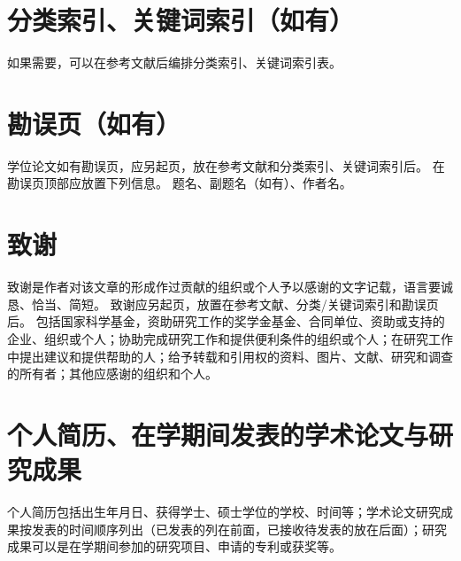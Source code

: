 \section{分类索引、关键词索引（如有）}

如果需要，可以在参考文献后编排分类索引、关键词索引表。

\section{勘误页（如有）}

学位论文如有勘误页，应另起页，放在参考文献和分类索引、关键词索引后。
在勘误页顶部应放置下列信息。
题名、副题名（如有）、作者名。

\section{致谢}

致谢是作者对该文章的形成作过贡献的组织或个人予以感谢的文字记载，语言要诚恳、恰当、简短。
致谢应另起页，放置在参考文献、分类/关键词索引和勘误页后。
包括国家科学基金，资助研究工作的奖学金基金、合同单位、资助或支持的企业、组织或个人；协助完成研究工作和提供便利条件的组织或个人；在研究工作中提出建议和提供帮助的人；给予转载和引用权的资料、图片、文献、研究和调查的所有者；其他应感谢的组织和个人。

\section{个人简历、在学期间发表的学术论文与研究成果}

个人简历包括出生年月日、获得学士、硕士学位的学校、时间等；学术论文研究成果按发表的时间顺序列出（已发表的列在前面，已接收待发表的放在后面）；研究成果可以是在学期间参加的研究项目、申请的专利或获奖等。
